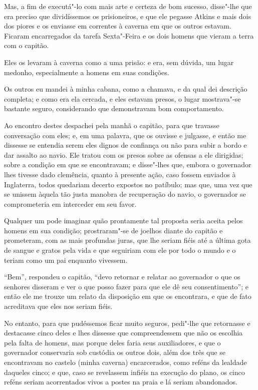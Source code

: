 Mas, a fim de executá"-lo com mais arte e certeza de bom sucesso,
disse"-lhe que era preciso que dividíssemos os prisioneiros, e que ele
pegasse Atkins e mais dois dos piores e os enviasse em correntes à
caverna em que os outros estavam. Ficaram encarregados da tarefa
Sexta"-Feira e os dois homens que vieram a terra com o capitão.

Eles os levaram à caverna como a uma prisão: e era, sem dúvida, um lugar
medonho, especialmente a homens em suas condições.

Os outros eu mandei à minha cabana, como a chamava, e da qual dei
descrição completa; e como era ela cercada, e eles estavam presos, o
lugar mostrava"-se bastante seguro, considerando que demonstravam bom
comportamento.

Ao encontro destes despachei pela manhã o capitão, para que travasse
conversação com eles; e, em uma palavra, que os ouvisse e julgasse, e
então me dissesse se entendia serem eles dignos de confiança ou não para
subir a bordo e dar assalto ao navio. Ele tratou com os presos sobre as
ofensas a ele dirigidas; sobre a condição em que se encontravam; e
disse"-lhes que, embora o governador lhes tivesse dado clemência, quanto
à presente ação, caso fossem enviados à Inglaterra, todos quedariam
decerto expostos no patíbulo; mas que, uma vez que se unissem àquela tão
justa manobra de recuperação do navio, o governador se comprometeria em
interceder em seu favor.

Qualquer um pode imaginar quão prontamente tal proposta seria aceita
pelos homens em sua condição; prostraram"-se de joelhos diante do capitão
e prometeram, com as mais profundas juras, que lhe seriam fiéis até a
última gota de sangue e gratos pela vida e que seguiriam com ele por
todo o mundo e o teriam como um pai enquanto vivessem.

``Bem'', respondeu o capitão, ``devo retornar e relatar ao governador o
que os senhores disseram e ver o que posso fazer para que ele dê seu
consentimento''; e então ele me trouxe um relato da disposição em que os
encontrara, e que de fato acreditava que eles nos seriam fiéis.

No entanto, para que pudéssemos ficar muito seguros, pedi"-lhe que
retornasse e destacasse cinco deles e lhes dissesse que compreendessem
que não os escolhia pela falta de homens, mas porque deles faria seus
auxiliadores, e que o governador conservaria sob custódia os outros
dois, além dos três que se encontravam no castelo (minha caverna)
encarcerados, como reféns da lealdade daqueles cinco; e que, caso se
revelassem infiéis na execução do plano, os cinco reféns seriam
acorrentados vivos a postes na praia e lá seriam abandonados.

